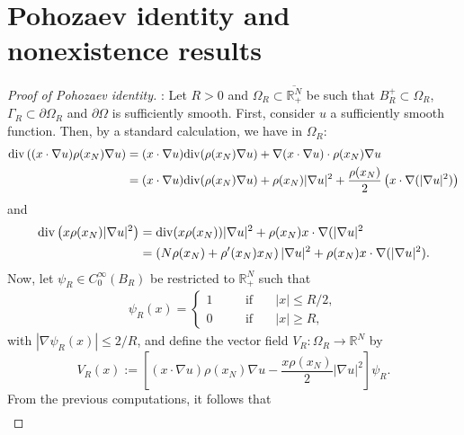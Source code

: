 \documentclass[12pt,reqno]{amsart}
\begin{document}
%
%


\section{Pohozaev identity and nonexistence results}    
    
\begin{proof}[Proof of Pohozaev identity]: Let $R>0$ and $\Omega_R \subset \overline{\mathds{R}^N_+}$ be such that $B_R^+\subset\Omega_R$, $\Gamma_R\subset \partial \Omega_R$ and $\partial \Omega$ is sufficiently smooth. First, consider $u$ a sufficiently smooth function. Then, by a standard calculation, we have in $\Omega_R$:
		\begin{align*}
			{
				\rm{div}}\left((x\cdot\nabla u)\rho(x_N)\nabla u\right)&=(x\cdot\nabla u)\mathrm{div}(\rho(x_N)\nabla u)+\nabla(x\cdot\nabla u)\cdot\rho(x_N)\nabla u\\
			&=(x\cdot\nabla u)\mathrm{div}(\rho(x_N)\nabla u)+\rho(x_N)|\nabla u|^2+\frac{\rho(x_N)}{2}\left(x\cdot\nabla (|\nabla u|^2)\right)
		\end{align*}
		and
		\begin{align*}
		{\rm{div}}\left(x\rho(x_N)|\nabla u|^2\right)&=\mathrm{div}(x\rho(x_N))|\nabla u|^2+\rho(x_N)x\cdot\nabla (|\nabla u|^2\\
        &=\left(N\rho(x_N)+\rho'(x_N)x_N\right)|\nabla u|^2+ \rho(x_N)x\cdot\nabla (|\nabla u|^2).
		\end{align*}
Now, let $\psi_R \in C_0^\infty(B_R)$ be restricted to $\mathds{R}^N_+$ such that  
        \begin{align*}
			\psi_{R}(x)=\left\{
			\begin{aligned}
				1&\quad&\text{if}&\quad |x|\leq R/2,\\
				0&\quad&\text{if}&\quad |x|\geq R,
			\end{aligned}
			\right.
		\end{align*}
with $|\nabla \psi_{R}(x)|\leq2/R$, and define the vector field $V_{R}: \Omega_R \longrightarrow\mathds{R}^N$ by
		\begin{equation*}%
		    V_{R}(x):=\left[(x\cdot\nabla u)\rho(x_N)\nabla u - \frac{x\rho(x_N)}{2}|\nabla u|^2\right]\psi_{R}.
		\end{equation*}
From the previous computations, it follows that		\begin{align*}\label{div V}

\end{align*}
\end{proof}
\end{document}
